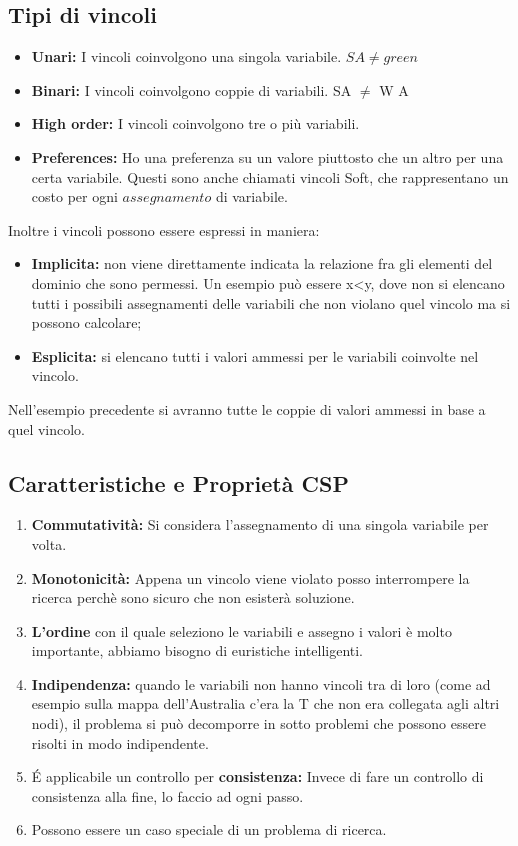 \subsection{Tipi di vincoli}
\begin{itemize}
    \item \textbf{Unari:} I vincoli coinvolgono una singola variabile. $SA \neq green$
    \item \textbf{Binari:} I vincoli coinvolgono coppie di variabili. SA $\neq$ W A
    \item \textbf{High order:} I vincoli coinvolgono tre o più variabili.
    \item \textbf{Preferences:} Ho una preferenza su un valore piuttosto che un altro per una certa variabile. Questi sono anche chiamati vincoli Soft, che rappresentano un costo per ogni $assegnamento$ di variabile.
\end{itemize}
Inoltre i vincoli possono essere espressi in maniera:
\begin{itemize}
    \item \textbf{Implicita:} non viene direttamente indicata la relazione fra gli elementi del dominio che sono permessi. Un esempio può essere x<y, dove non si elencano tutti i possibili assegnamenti delle variabili che non violano quel vincolo ma si possono calcolare;
    \item \textbf{Esplicita:} si elencano tutti i valori ammessi per le variabili coinvolte nel vincolo. 
\end{itemize}
Nell’esempio precedente si avranno tutte le coppie di valori ammessi in base a quel
vincolo.

\subsection{Caratteristiche e Proprietà CSP}
\begin{enumerate}
    \item \textbf{Commutatività:} Si considera l’assegnamento di una singola variabile per volta.
    \item \textbf{Monotonicità:} Appena un vincolo viene violato posso interrompere la ricerca perchè sono sicuro che non esisterà soluzione.
    \item \textbf{L’ordine} con il quale seleziono le variabili e assegno i valori è molto importante, abbiamo bisogno di euristiche intelligenti.
    \item \textbf{Indipendenza:} quando le variabili non hanno vincoli tra di loro (come ad esempio sulla mappa dell’Australia c’era la T che non era collegata agli altri nodi), il problema si può decomporre in sotto problemi che possono essere risolti in modo indipendente.
    \item É applicabile un controllo per \textbf{consistenza:} Invece di fare un controllo di consistenza alla fine, lo faccio ad ogni passo.
    \item Possono essere un caso speciale di un problema di ricerca.
\end{enumerate}
